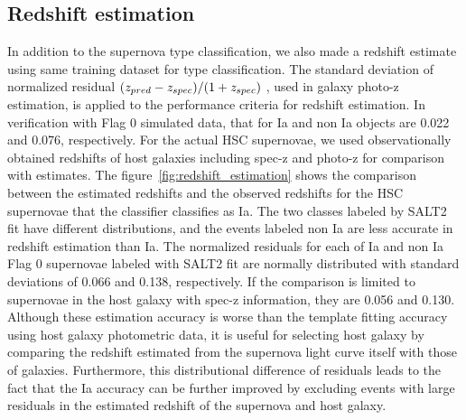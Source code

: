 \documentclass[useamsfonts]{pasj01}
\begin{document}
\subsection{Redshift estimation}
%
In addition to the supernova type classification,
we also made a redshift estimate using same training dataset for type classification.
The standard deviation of normalized residual $(z_{\rm pred}-z_{\rm spec})/(1+z_{\rm spec})$ \citep{Salvato_2009,Salvato_2019}, used in galaxy photo-z estimation, is applied to the performance criteria for redshift estimation.
In verification with Flag 0 simulated data, that for Ia and non Ia objects are 0.022 and 0.076, respectively.
For the actual HSC supernovae, we used observationally obtained redshifts of host galaxies including spec-z and photo-z for comparison with estimates.
The figure\ \ref{fig:redshift_estimation} shows the comparison between the estimated redshifts and the observed redshifts for the HSC supernovae that the classifier classifies as Ia.
The two classes labeled by SALT2 fit have different distributions, and the events labeled non Ia are less accurate in redshift estimation than Ia.
The normalized residuals for each of Ia and non Ia Flag 0 supernovae labeled with SALT2 fit are normally distributed with standard deviations of 0.066 and 0.138, respectively.
If the comparison is limited to supernovae in the host galaxy with spec-z information, they are 0.056 and 0.130.
Although these estimation accuracy is worse than the template fitting accuracy using host galaxy photometric data, it is useful for selecting host galaxy by comparing the redshift estimated from the supernova light curve itself with those of galaxies.
Furthermore, this distributional difference of residuals leads to the fact that the Ia accuracy can be further improved by excluding events with large residuals in the estimated redshift of the supernova and host galaxy.
%
\end{document}
